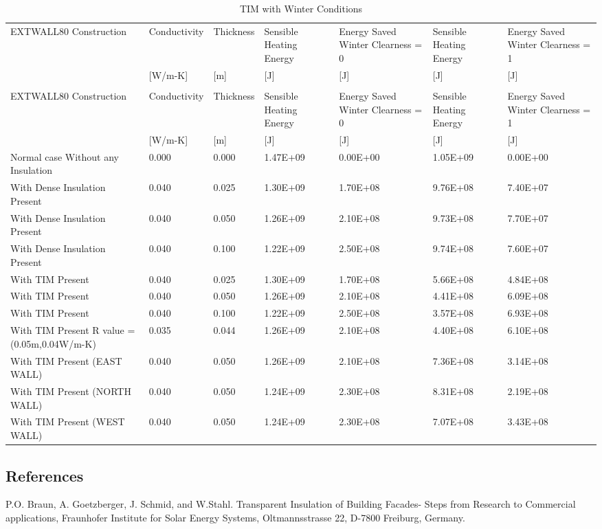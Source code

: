 {\scriptsize
\begin{longtable}[c]{p{1.0in}p{0.75in}p{0.75in}p{0.75in}p{0.75in}p{0.75in}p{0.75in}}
\caption{TIM with Winter Conditions \label{table:tim-with-winter-conditions-000}} \tabularnewline
\toprule
EXTWALL80 Construction & Conductivity & Thickness & Sensible Heating Energy & Energy Saved Winter Clearness = 0 & Sensible Heating Energy & Energy Saved Winter Clearness = 1 \tabularnewline
~ & [W/m-K] & [m] & [J] & [J] & [J] & [J] \tabularnewline
\midrule
\endfirsthead

\caption[]{TIM with Winter Conditions} \tabularnewline
\toprule
EXTWALL80 Construction & Conductivity & Thickness & Sensible Heating Energy & Energy Saved Winter Clearness = 0 & Sensible Heating Energy & Energy Saved Winter Clearness = 1 \tabularnewline
~ & [W/m-K] & [m] & [J] & [J] & [J] & [J] \tabularnewline
\midrule
\endhead

Normal case Without any Insulation & 0.000 & 0.000 & 1.47E+09 & 0.00E+00 & 1.05E+09 & 0.00E+00 \tabularnewline
With Dense Insulation Present & 0.040 & 0.025 & 1.30E+09 & 1.70E+08 & 9.76E+08 & 7.40E+07 \tabularnewline
With Dense Insulation Present & 0.040 & 0.050 & 1.26E+09 & 2.10E+08 & 9.73E+08 & 7.70E+07 \tabularnewline
With Dense Insulation Present & 0.040 & 0.100 & 1.22E+09 & 2.50E+08 & 9.74E+08 & 7.60E+07 \tabularnewline
With TIM Present & 0.040 & 0.025 & 1.30E+09 & 1.70E+08 & 5.66E+08 & 4.84E+08 \tabularnewline
With TIM Present & 0.040 & 0.050 & 1.26E+09 & 2.10E+08 & 4.41E+08 & 6.09E+08 \tabularnewline
With TIM Present & 0.040 & 0.100 & 1.22E+09 & 2.50E+08 & 3.57E+08 & 6.93E+08 \tabularnewline
With TIM Present R value = (0.05m,0.04W/m-K) & 0.035 & 0.044 & 1.26E+09 & 2.10E+08 & 4.40E+08 & 6.10E+08 \tabularnewline
With TIM Present (EAST WALL) & 0.040 & 0.050 & 1.26E+09 & 2.10E+08 & 7.36E+08 & 3.14E+08 \tabularnewline
With TIM Present (NORTH WALL) & 0.040 & 0.050 & 1.24E+09 & 2.30E+08 & 8.31E+08 & 2.19E+08 \tabularnewline
With TIM Present (WEST WALL) & 0.040 & 0.050 & 1.24E+09 & 2.30E+08 & 7.07E+08 & 3.43E+08 \tabularnewline
\bottomrule
\end{longtable}}

\subsection{References}\label{references-046}

P.O. Braun, A. Goetzberger, J. Schmid, and W.Stahl. Transparent Insulation of Building Facades- Steps from Research to Commercial applications, Fraunhofer Institute for Solar Energy Systems, Oltmannsstrasse 22, D-7800 Freiburg, Germany.

